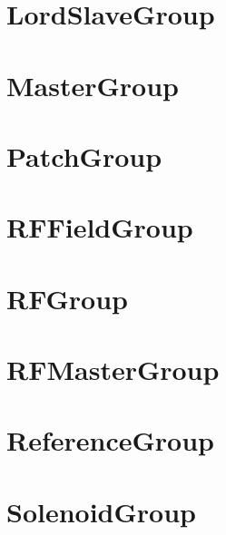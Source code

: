 \section{LordSlaveGroup}
\label{s:lord.slave.g}

\section{MasterGroup}
\label{s:master.g}

\section{PatchGroup}
\label{s:patch.g}

\section{RFFieldGroup}
\label{s:rffield.g}

\section{RFGroup}
\label{s:rf.g}

\section{RFMasterGroup}
\label{s:rfmaster.g}

\section{ReferenceGroup}
\label{s:reference.g}

\section{SolenoidGroup}
\label{s:solenoid.g}

